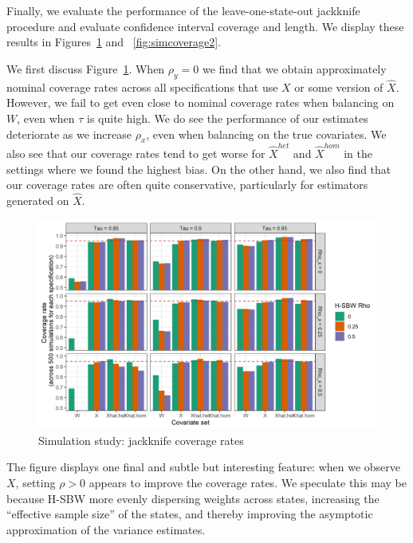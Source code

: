Finally, we evaluate the performance of the leave-one-state-out jackknife procedure and evaluate confidence interval coverage and length. We display these results in Figures~\ref{fig:simcoverage1} and ~\ref{fig:simcoverage2}. 

We first discuss Figure~\ref{fig:simcoverage1}. When $\rho_y = 0$ we find that we obtain approximately nominal coverage rates across all specifications that use $X$ or some version of $\hat{X}$. However, we fail to get even close to nominal coverage rates when balancing on $W$, even when $\tau$ is quite high. We do see the performance of our estimates deteriorate as we increase $\rho_x$, even when balancing on the true covariates. We also see that our coverage rates tend to get worse for $\hat{X}^{het}$ and $\hat{X}^{hom}$ in the settings where we found the highest bias. On the other hand, we also find that our coverage rates are often quite conservative, particularly for estimators generated on $\hat{X}$. 

\begin{figure}[H]
\begin{center}
    \caption{Simulation study: jackknife coverage rates}\label{fig:simcoverage1}
    \includegraphics[scale=0.5]{01_Plots/coverage-plot-1.png}
\end{center}
\end{figure}

The figure displays one final and subtle but interesting feature: when we observe $X$, setting $\rho > 0$ appears to improve the coverage rates. We speculate this may be because H-SBW more evenly dispersing weights across states, increasing the ``effective sample size'' of the states, and thereby improving the asymptotic approximation of the variance estimates. 

